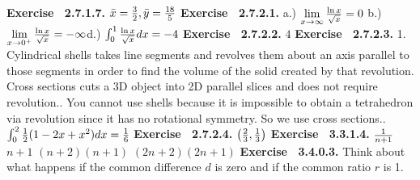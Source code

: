  {\noindent \protect \bf  Exercise ~2.7.1.7.} $\protect \mathaccentV {bar}016{x}=\protect \frac  {3}{2}, \protect \mathaccentV {bar}016{y}= \protect \frac  {18}{5} $ \protect \newline  \protect \newline  
 {\noindent \protect \bf  Exercise ~2.7.2.1.} a.) $\protect \qopname  \relax m{lim}\limits _{x\rightarrow \infty }{\protect \frac  {\protect \qopname  \relax o{ln}{x}}{\protect \sqrt  {x}}}=0$ \protect \newline  b.) $\protect \qopname  \relax m{lim}\limits _{x\rightarrow 0^+}{\protect \frac  {\protect \qopname  \relax o{ln}{x}}{\protect \sqrt  {x}}}=-\infty $\protect \newline  d.) $\intop _{0}^{1}{\protect \frac  {\protect \qopname  \relax o{ln}{x}}{\protect \sqrt  {x}}dx}=-4$  \protect \newline  \protect \newline  
 {\noindent \protect \bf  Exercise ~2.7.2.2.}  $4$ \protect \newline  \protect \newline  
 {\noindent \protect \bf  Exercise ~2.7.2.3.} 1. Cylindrical shells takes line segments and revolves them about an axis parallel to those segments in order to find the volume of the solid created by that revolution. Cross sections cuts a 3D object into 2D parallel slices and does not require revolution.\protect {}. You cannot use shells because it is impossible to obtain a tetrahedron via revolution since it has no rotational symmetry. So we use cross sections.\protect {}. $\intop _0^2 {\protect \frac  {1}{2}(1-2x+x^2)dx}=\protect \frac  {1}{6} $  \protect \newline  \protect \newline  
 {\noindent \protect \bf  Exercise ~2.7.2.4.} $\left (\protect \frac  {2}{3},\protect \frac  {1}{3} \right ) $ \protect \newline  \protect \newline  
 {\noindent \protect \bf  Exercise ~3.3.1.4.} \textbullet $\protect \frac  {1}{n+1}$ \textbullet $n+1$ \textbullet $(n+2)(n+1)$ \textbullet $(2n+2)(2n+1)$ \protect \newline  \protect \newline  
 {\noindent \protect \bf  Exercise ~3.4.0.3.} Think about what happens if the common difference $d$ is zero and if the common ratio $r$ is 1. \protect \newline  \protect \newline  
